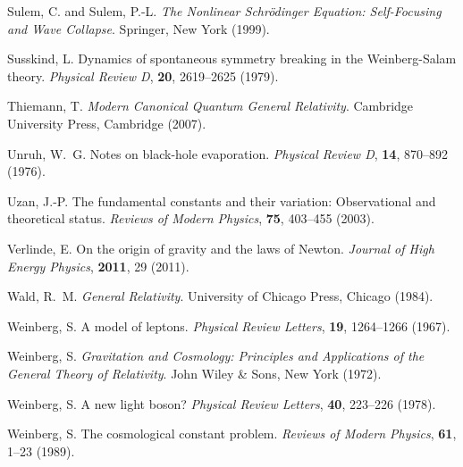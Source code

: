 \documentclass[12pt,a4paper]{article}
\begin{document}
\begin{thebibliography}{99}
		Sulem, C. and Sulem, P.-L.
		\newblock \textit{The Nonlinear Schrödinger Equation: Self-Focusing and Wave Collapse}.
		\newblock Springer, New York (1999).
		
		Susskind, L.
		\newblock Dynamics of spontaneous symmetry breaking in the Weinberg-Salam theory.
		\newblock \textit{Physical Review D}, \textbf{20}, 2619--2625 (1979).
		\newblock {}
		
		Thiemann, T.
		\newblock \textit{Modern Canonical Quantum General Relativity}.
		\newblock Cambridge University Press, Cambridge (2007).
		
		Unruh, W.~G.
		\newblock Notes on black-hole evaporation.
		\newblock \textit{Physical Review D}, \textbf{14}, 870--892 (1976).
		\newblock {}
		
		Uzan, J.-P.
		\newblock The fundamental constants and their variation: Observational and theoretical status.
		\newblock \textit{Reviews of Modern Physics}, \textbf{75}, 403--455 (2003).
		\newblock {}
		
		Verlinde, E.
		\newblock On the origin of gravity and the laws of Newton.
		\newblock \textit{Journal of High Energy Physics}, \textbf{2011}, 29 (2011).
		\newblock {}
		
		Wald, R.~M.
		\newblock \textit{General Relativity}.
		\newblock University of Chicago Press, Chicago (1984).
		
		Weinberg, S.
		\newblock A model of leptons.
		\newblock \textit{Physical Review Letters}, \textbf{19}, 1264--1266 (1967).
		\newblock {}
		
		Weinberg, S.
		\newblock \textit{Gravitation and Cosmology: Principles and Applications of the General Theory of Relativity}.
		\newblock John Wiley \& Sons, New York (1972).
		
		Weinberg, S.
		\newblock A new light boson?
		\newblock \textit{Physical Review Letters}, \textbf{40}, 223--226 (1978).
		\newblock {}
		
		Weinberg, S.
		\newblock The cosmological constant problem.
		\newblock \textit{Reviews of Modern Physics}, \textbf{61}, 1--23 (1989).
		\newblock {}
		

\end{thebibliography}
\end{document}
